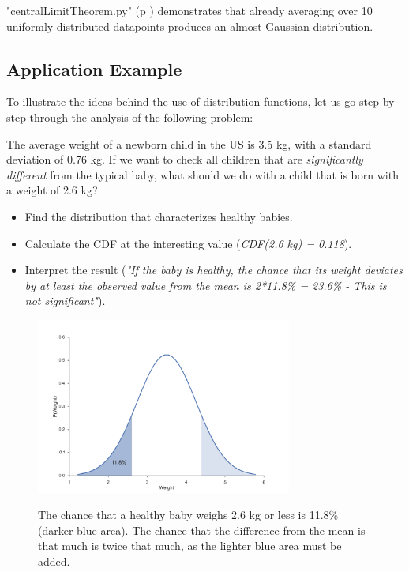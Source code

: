 \PyImg "centralLimitTheorem.py" (p \pageref{py:centralLimitTheorem}) demonstrates that already averaging over 10 uniformly distributed datapoints produces an almost Gaussian distribution.

\subsection{Application Example}

To illustrate the ideas behind the use of distribution functions, let us go step-by-step through the analysis of the following problem:

The average weight of a newborn child in the US is 3.5 kg, with a standard deviation of 0.76 kg. If we want to check all children that are \emph{significantly different} from the typical baby, what should we do with a child that is born with a weight of 2.6 kg?

\begin{itemize}
  \item Find the distribution that characterizes healthy babies.
  \item Calculate the CDF at the interesting value (\emph{CDF(2.6 kg) = 0.118}).
  \item Interpret the result (\emph{"If the baby is healthy, the chance that its weight deviates by at least the observed value from the mean is 2*11.8\% = 23.6\% - This is not significant"}).
\end{itemize}

\begin{figure}[h]
  \centering
  \includegraphics[width=0.75\textwidth]{../Images/pdf_checkValue.png}\\
  \caption{The chance that a healthy baby weighs 2.6 kg or less is 11.8\% (darker blue area). The chance that the difference from the mean is that much is twice that much, as the lighter blue area must be added.}\label{fig:pdf_checkValue}
\end{figure}

